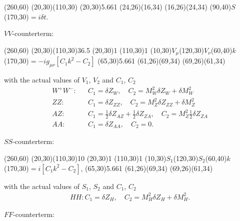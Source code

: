 \begin{axopicture}(260,60)
	\Line(20,30)(110,30)
	\GCirc(20,30){5.66}{1}	
	\Line(24,26)(16,34)
	\Line(16,26)(24,34)
	\Text(90,40){$S$}
	\Text(170,30){$=i\delta t$.}
\end{axopicture}

$VV$-counterterm:

\begin{axopicture}(260,60) %
	\Photon(20,30)(110,30){3}{6.5}
	\Vertex(20,30){1}
	\Vertex(110,30){1}
	\Text(10,30){$V_\mu$}\Text(120,30){$V_\nu$}\Text(60,40){$k$}
	\Text(170,30){$=-ig_{\mu\nu}[C_1 k^2-C_2]$}
	\GCirc(65,30){5.66}{1}	
	\Line(61,26)(69,34)
	\Line(69,26)(61,34)	 %
	
\end{axopicture}
\newline with the actual values of $V_1$, $V_2$ and $C_1$, $C_2$
\begin{eqnarray}
W^+W^-:&& C_1=\delta Z_W, \quad C_2=M_W^2\delta Z_W+\delta M_W^2\nonumber\\
ZZ:&&  C_1=\delta Z_{ZZ}, \quad C_2=M_Z^2\delta Z_{ZZ}+\delta M_Z^2\nonumber\\
AZ:&&  C_1=\frac{1}{2}\delta Z_{AZ}+\frac{1}{2}\delta Z_{ZA}, \quad C_2=M_Z^2\frac{1}{2}\delta Z_{ZA}\nonumber\\
AA:&& C_1=\delta Z_{AA}, \quad C_2=0.
\end{eqnarray}

$SS$-counterterm:

\begin{axopicture}(260,60) %
	\DashLine(20,30)(110,30){10}
	\Vertex(20,30){1}
	\Vertex(110,30){1}
	\Text(10,30){$S_1$}\Text(120,30){${S_2}$}\Text(60,40){$k$}
	\Text(170,30){$=i[C_1 k^2-C_2]$,}
	\GCirc(65,30){5.66}{1}		
	\Line(61,26)(69,34)
	\Line(69,26)(61,34)	 %
	
\end{axopicture}
\newline with the actual values of $S_1$, $S_2$ and $C_1$, $C_2$
\begin{eqnarray}
HH:C_1=\delta Z_H,\quad C_2=M_H^2\delta Z_H+\delta M_H^2.
\end{eqnarray}

$FF$-counterterm:

